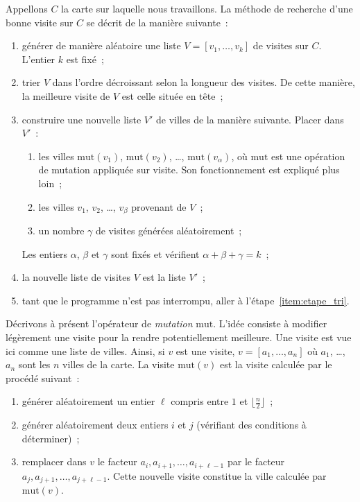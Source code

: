 \documentclass[12pt]{article}
\theoremstyle{definition}
\newcommand{\Mut}{\mathrm{mut}}
\begin{document}
Appellons $C$ la carte sur laquelle nous travaillons. La méthode de 
recherche d'une bonne visite sur $C$ se décrit de la manière suivante~:
\begin{enumerate}
    \item générer de manière aléatoire une liste $V = [v_1, \dots, v_k]$ 
    de visites sur $C$. L'entier $k$ est fixé~;
    \item \label{item:etape_tri}
    trier $V$ dans l'ordre décroissant selon la longueur des visites.
    De cette manière, la meilleure visite de $V$ est celle située en
    tête~;
    \item construire une nouvelle liste $V'$ de villes de la manière 
    suivante. Placer dans $V'$~:
    \begin{enumerate}
        \item les villes $\Mut(v_1)$, $\Mut(v_2)$, \dots, 
        $\Mut(v_{\alpha})$, où $\Mut$ est une opération de mutation
        appliquée sur visite. Son fonctionnement est expliqué plus loin~;
        \item les villes $v_1$, $v_2$, \dots, $v_\beta$ provenant de $V$~;
        \item un nombre $\gamma$ de visites générées aléatoirement~;
    \end{enumerate}
    Les entiers $\alpha$, $\beta$ et $\gamma$ sont fixés et vérifient
    $\alpha + \beta + \gamma = k$~;
    \item la nouvelle liste de visites $V$ est la liste $V'$~;
    \item tant que le programme n'est pas interrompu, aller à 
    l'étape~\ref{item:etape_tri}.
\end{enumerate}
\medskip

Décrivons à présent l'opérateur de {\em mutation} $\Mut$. L'idée
consiste à modifier légèrement une visite pour la rendre potentiellement
meilleure. Une visite est vue ici comme une liste de villes. Ainsi,
si $v$ est une visite, $v = [a_1, \dots, a_n]$ où $a_1$, \dots, $a_n$
sont les $n$ villes de la carte. La visite
$\Mut(v)$ est la visite calculée par 
le procédé suivant~:
\begin{enumerate}
    \item générer aléatoirement un entier $\ell$ compris entre $1$
    et $\lfloor\frac{n}{2}\rfloor$~;
    \item générer aléatoirement deux entiers $i$ et $j$ (vérifiant des
    conditions à déterminer)~;
    \item remplacer dans $v$ le facteur 
    $a_i, a_{i + 1}, \dots, a_{i + \ell - 1}$ par le facteur
    $a_j, a_{j + 1}, \dots, a_{j + \ell - 1}$. Cette nouvelle 
    visite constitue la ville calculée par $\Mut(v)$.
\end{enumerate}
\end{document}
